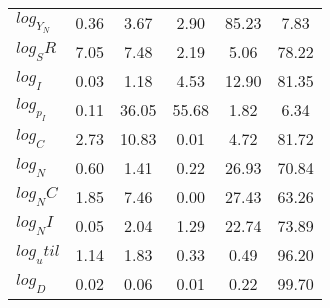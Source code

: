 \begin{center}
\begin{longtable}{lccccc}
$log_Y_N   $	 & 	        0.36	 & 	        3.67	 & 	        2.90	 & 	       85.23	 & 	        7.83 \\ 
$log_SR    $	 & 	        7.05	 & 	        7.48	 & 	        2.19	 & 	        5.06	 & 	       78.22 \\ 
$log_I     $	 & 	        0.03	 & 	        1.18	 & 	        4.53	 & 	       12.90	 & 	       81.35 \\ 
$log_p_I   $	 & 	        0.11	 & 	       36.05	 & 	       55.68	 & 	        1.82	 & 	        6.34 \\ 
$log_C     $	 & 	        2.73	 & 	       10.83	 & 	        0.01	 & 	        4.72	 & 	       81.72 \\ 
$log_N     $	 & 	        0.60	 & 	        1.41	 & 	        0.22	 & 	       26.93	 & 	       70.84 \\ 
$log_NC    $	 & 	        1.85	 & 	        7.46	 & 	        0.00	 & 	       27.43	 & 	       63.26 \\ 
$log_NI    $	 & 	        0.05	 & 	        2.04	 & 	        1.29	 & 	       22.74	 & 	       73.89 \\ 
$log_util  $	 & 	        1.14	 & 	        1.83	 & 	        0.33	 & 	        0.49	 & 	       96.20 \\ 
$log_D     $	 & 	        0.02	 & 	        0.06	 & 	        0.01	 & 	        0.22	 & 	       99.70 \\ 
\end{longtable}
 \end{center}
